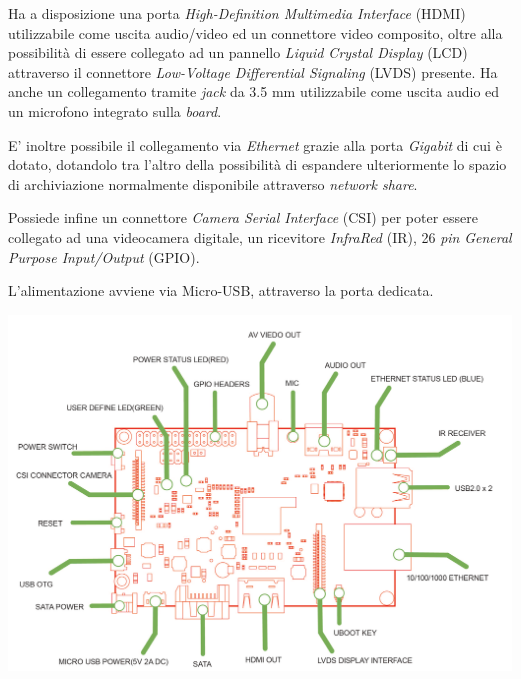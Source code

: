 Ha a disposizione una porta \textit{High-Definition Multimedia Interface} 
(HDMI) utilizzabile come uscita audio/video ed un connettore video composito, 
oltre alla possibilità di essere collegato ad un pannello \textit{Liquid 
Crystal Display} (LCD) attraverso il connettore \textit{Low-Voltage 
Differential Signaling} (LVDS) presente. Ha anche un collegamento tramite 
\emph{jack} da 3.5 mm utilizzabile come uscita audio ed un microfono integrato 
sulla \emph{board}.

E' inoltre possibile il collegamento via \textit{Ethernet} grazie alla porta 
\textit{Gigabit} di cui è dotato, dotandolo tra l'altro della possibilità di 
espandere ulteriormente lo spazio di archiviazione normalmente disponibile 
attraverso \emph{network share}.

Possiede infine un connettore \textit{Camera Serial Interface} (CSI) per poter 
essere collegato ad una videocamera digitale, un ricevitore \textit{InfraRed} 
(IR), 26 \textit{pin} \textit{General Purpose Input/Output} (GPIO).

L'alimentazione avviene via Micro-USB, attraverso la porta dedicata.

\includegraphics[width=1\textwidth]{Figures/bananapi_schema.png}